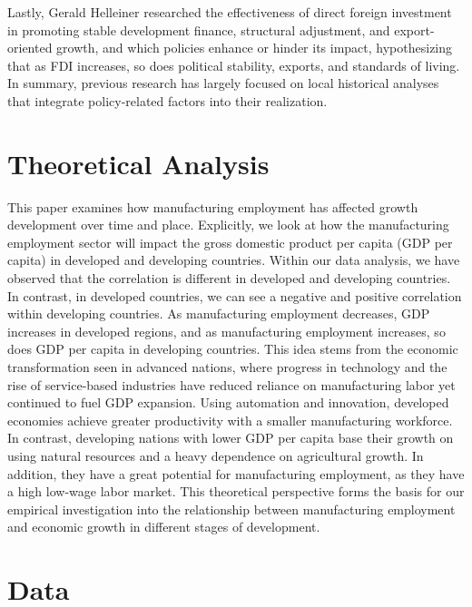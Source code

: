 \documentclass[12pt]{article}
\begin{document}
Lastly, Gerald Helleiner researched the effectiveness of direct foreign investment in promoting stable development finance, structural adjustment, and export-oriented growth, and which policies enhance or hinder its impact, hypothesizing that as FDI increases, so does political stability, exports, and standards of living. In summary, previous research has largely focused on local historical analyses that integrate policy-related factors into their realization.

\section{Theoretical Analysis}
\label{sec:theory}
This paper examines how manufacturing employment has affected growth development over time and place. Explicitly, we look at how the manufacturing employment sector will impact the gross domestic product per capita (GDP per capita) in developed and developing countries. Within our data analysis, we have observed that the correlation is different in developed and developing countries. In contrast, in developed countries, we can see a negative and positive correlation within developing countries. As manufacturing employment decreases, GDP increases in developed regions, and as manufacturing employment increases, so does GDP per capita in developing countries. This idea stems from the economic transformation seen in advanced nations, where progress in technology and the rise of service-based industries have reduced reliance on manufacturing labor yet continued to fuel GDP expansion. Using automation and innovation, developed economies achieve greater productivity with a smaller manufacturing workforce. In contrast, developing nations with lower GDP per capita base their growth on using natural resources and a heavy dependence on agricultural growth. In addition, they have a great potential for manufacturing employment, as they have a high low-wage labor market. This theoretical perspective forms the basis for our empirical investigation into the relationship between manufacturing employment and economic growth in different stages of development.


\section{Data}
\label{sec:data}
\end{document}
